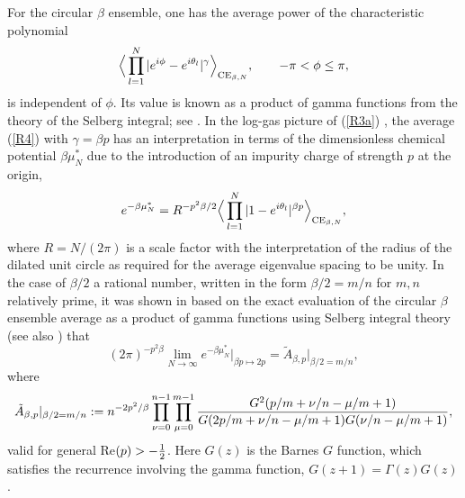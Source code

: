 \documentclass[11pt,a4paper]{article}
\numberwithin{equation}{section} %
\theoremstyle{plain}
\theoremstyle{definition}
\numberwithin{prop}{section}
\numberwithin{cor}{section}
\numberwithin{remark}{section}
\begin{document}
   
   
   For the circular $\beta$ ensemble, one has the average power of the characteristic polynomial
\begin{equation}\label{R4}   
\Big \langle \prod_{l=1}^N |e^{i \phi}  - e^{i \theta_l} |^\gamma  \Big \rangle_{{\rm CE}_{\beta,N}}, \qquad - \pi < \phi \le \pi,
  \end{equation}  
  is independent of $\phi$. Its value is known as a product of gamma functions from the theory of the Selberg integral;
  see \cite[Eq.~(4.4)]{Fo10}. In the log-gas picture of (\ref{R3a}) \cite{Dy62}, the average (\ref{R4}) with $\gamma = \beta p$ has an interpretation in
  terms of the dimensionless chemical potential $\beta \mu_N^*$ due to the introduction of an impurity charge of strength $p$ at the origin,
 \begin{equation}\label{R4a} 
 e^{-   \beta \mu_N^*} = R^{-p^2 \beta / 2} \Big \langle   \prod_{l=1}^N |1 - e^{i \theta_l}|^{\beta p}
 \Big  \rangle_{{\rm CE}_{\beta,N}},
   \end{equation}  
   where $R = N/(2 \pi)$ is a scale factor with the interpretation of the radius of the dilated unit circle  as required for the average eigenvalue spacing to
   be unity. In the case of $\beta/2$ a rational number, written in the form $\beta /2 = m/n$ for $m,n$ relatively prime, it was shown in 
   \cite{Fo92j} based on the exact evaluation of the circular $\beta$ ensemble average as a product of gamma functions using Selberg integral theory (see also \cite[Exercises 4.8 q.4]{Fo10}) that
   \begin{equation}\label{3.qb1}
(2 \pi )^{-p^2 \beta} \lim_{N \to \infty}e^{-\beta \mu^*_N} \Big |_{\beta p \mapsto 2p}
=  \tilde{A}_{\beta,p} |_{\beta/2=m/n},
\end{equation}
where
\begin{equation}\label{3.qb1+}
\tilde{A}_{\beta,p} |_{\beta/2=m/n} := n^{-2 p^2/\beta}
\prod_{\nu=0}^{n-1} \prod_{\mu=0}^{m-1}
{ G^2(p/m+\nu/n-\mu/m+1) \over
G(2p/m+\nu/n-\mu/m+1) G(\nu/n-\mu/m+1) },
\end{equation}
valid for general Re$(p) > - {1 \over 2}$.
Here $G(z)$ is the Barnes $G$ function, which satisfies the recurrence involving the gamma function,
$G(z+1) = \Gamma(z) G(z)$.
\end{document}
